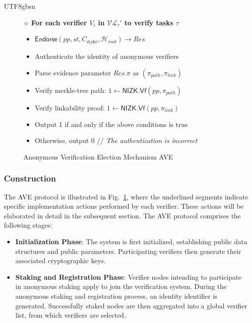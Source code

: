\documentclass[runningheads]{llncs}
\newcommand{\nizkvf}{\mathsf{NIZK.Vf}}
\begin{document}
\begin{CJK*}{UTF8}{gbsn}
\begin{figure}[h!]
{{\vspace{-8pt}
$\diamond$ \textbf{For each verifier $V_i$ in $\mathcal{VL}_\tau'$ to verify tasks $\tau$ }
\vspace{-8pt}
    \begin{itemize}
        \item $\underline{  \mathsf{Endorse} (pp, st, C_{\text{stake}}, \mathcal{H}_{root}) \rightarrow Res }$
        \item Authenticate the identity of anonymous verifiers
        \item Parse evidence parameter $Res.\pi$ as $ (\pi_{path}, \pi_{link})$
        \item Verify merkle-tree path: $1 \leftarrow \nizkvf(pp, \pi_{path})$
        \item Verify linkability proof: $ 1 \leftarrow \nizkvf(pp, \pi_{link}) $
        \item Output 1 if and only if the above conditions is true
        \item Otherwise, output 0 \textcolor{mygray}
    {\footnotesize // \emph{The authentication is incorrect}}
    \end{itemize}
\vspace{-8pt}
            }
	 }
	\caption{Anonymous Verification Election Mechanism AVE} 
        \vspace{-15pt}
	\label{AVE}
\end{figure}

\subsubsection{Construction}

The AVE protocol is illustrated in Fig.~\ref{AVE}, where the underlined segments indicate specific implementation actions performed by each verifier. These actions will be elaborated in detail in the subsequent section. The AVE protocol comprises the following stages:

\begin{itemize}
    \item \textbf{Initialization Phase}: The system is first initialized, establishing public data structures and public parameters. Participating verifiers then generate their associated cryptographic keys.

    \item \textbf{Staking and Registration Phase}: Verifier nodes intending to participate in anonymous staking apply to join the verification system. During the anonymous staking and registration process, an identity identifier is generated. Successfully staked nodes are then aggregated into a global verifier list, from which verifiers are selected.


\end{itemize}
\end{CJK*}
\end{document}
